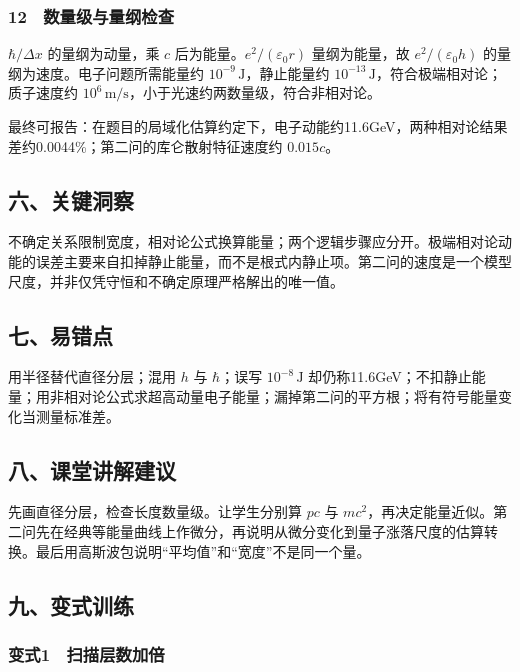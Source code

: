 \documentclass[12pt,a4paper,fontset=fandol]{ctexart}
\begin{document}
\subsubsection{12　数量级与量纲检查}\label{ux6570ux91cfux7ea7ux4e0eux91cfux7eb2ux68c0ux67e5}

\(\hbar/\Delta x\) 的量纲为动量，乘 \(c\)
后为能量。\(e^2/(\varepsilon_0r)\) 量纲为能量，故
\(e^2/(\varepsilon_0h)\) 的量纲为速度。电子问题所需能量约
\(10^{-9}\,\mathrm J\)，静止能量约
\(10^{-13}\,\mathrm J\)，符合极端相对论；质子速度约
\(10^6\,\mathrm{m/s}\)，小于光速约两数量级，符合非相对论。

最终可报告：在题目的局域化估算约定下，电子动能约11.6GeV，两种相对论结果差约0.0044\%；第二问的库仑散射特征速度约
\(0.015c\)。

\subsection{六、关键洞察}\label{ux516dux5173ux952eux6d1eux5bdf-3}

不确定关系限制宽度，相对论公式换算能量；两个逻辑步骤应分开。极端相对论动能的误差主要来自扣掉静止能量，而不是根式内静止项。第二问的速度是一个模型尺度，并非仅凭守恒和不确定原理严格解出的唯一值。

\subsection{七、易错点}\label{ux4e03ux6613ux9519ux70b9-3}

用半径替代直径分层；混用 \(h\) 与 \(\hbar\)；误写 \(10^{-8}\,\mathrm J\)
却仍称11.6GeV；不扣静止能量；用非相对论公式求超高动量电子能量；漏掉第二问的平方根；将有符号能量变化当测量标准差。

\subsection{八、课堂讲解建议}\label{ux516bux8bfeux5802ux8bb2ux89e3ux5efaux8bae-3}

先画直径分层，检查长度数量级。让学生分别算 \(pc\) 与
\(mc^2\)，再决定能量近似。第二问先在经典等能量曲线上作微分，再说明从微分变化到量子涨落尺度的估算转换。最后用高斯波包说明``平均值''和``宽度''不是同一个量。

\subsection{九、变式训练}\label{ux4e5dux53d8ux5f0fux8badux7ec3-3}

\subsubsection{变式1　扫描层数加倍}\label{ux53d8ux5f0f1-ux626bux63cfux5c42ux6570ux52a0ux500d}
\end{document}
